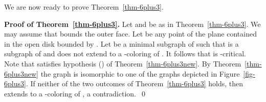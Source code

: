 \documentclass{article}
\begin{document}
We are now ready to prove Theorem~\ref{thm-6plus3}.
\bigskip

\noindent
{\bf Proof of Theorem~\ref{thm-6plus3}.}
Let  and  be as in Theorem~\ref{thm-6plus3}.
We may assume that  bounds the outer face.  Let  be any point of the
plane contained in the open disk bounded by .
Let  be a minimal subgraph of  such that  is a subgraph of 
and  does not extend to a -coloring of .
It follows that  is -critical.
Note that  satisfies hypothesis () of  Theorem~\ref{thm-6plus3new}.
By Theorem~\ref{thm-6plus3new} the graph  is isomorphic to one of
the graphs depicted in Figure~\ref{fig-6plus3}.
If neither of the two outcomes of Theorem~\ref{thm-6plus3} holds,
then  extends to a -coloring of , a contradiction.~\qed

\def\JCTB{{\it J.~Combin.\ Theory Ser.\ B}}
\def\JGT{{\it J.~Graph Theory}}
\end{document}
